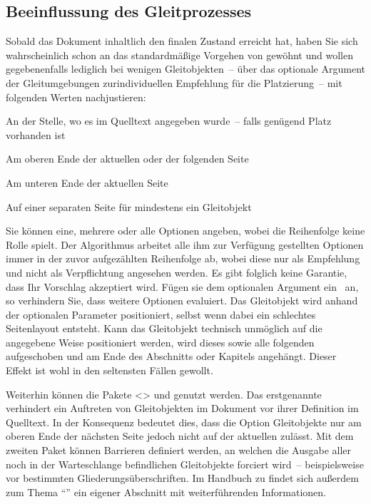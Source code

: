 \documentclass[%
  english,ngerman,%
  cdgeometry=no,DIV=12,%
  cd=false,cdfont=false,cdtitle=true,%
  headings=normal,%
  automark,%
  listof=toc,%
]{tudscrartcl}
\begin{document}
\subsection{Beeinflussung des Gleitprozesses}

Sobald das Dokument inhaltlich den finalen Zustand erreicht hat, haben Sie sich 
wahrscheinlich schon an das standardmäßige Vorgehen von  
gewöhnt und wollen gegebenenfalls lediglich bei wenigen Gleitobjekten~-- über 
das optionale Argument der Gleitumgebungen zurindividuellen Empfehlung für die 
Platzierung~-- mit folgenden Werten nachjustieren:
%
\begin{description}[labelindent=\parindent,leftmargin=*,style=nextline,itemsep=0pt]
\item[\OPValue{h} (here)]
  An der Stelle, wo es im Quelltext angegeben wurde~-- falls genügend Platz 
  vorhanden ist
\item[\OPValue{t} (top)]
  Am oberen Ende der aktuellen oder der folgenden Seite
\item[\OPValue{b} (bottom)]
  Am unteren Ende der aktuellen Seite
\item[\OPValue{p} (page)]
  Auf einer separaten Seite für mindestens ein Gleitobjekt
\end{description}
%
Sie können eine, mehrere oder alle Optionen angeben, wobei die Reihenfolge 
keine Rolle spielt. Der Algorithmus arbeitet alle ihm zur Verfügung gestellten 
Optionen immer in der zuvor aufgezählten Reihenfolge ab, wobei diese nur als 
Empfehlung und nicht als Verpflichtung angesehen werden. Es gibt folglich keine 
Garantie, dass Ihr Vorschlag akzeptiert wird. Fügen sie dem optionalen Argument 
ein~\PValue{!} an, so verhindern Sie, dass  weitere Optionen 
evaluiert. Das Gleitobjekt wird anhand der optionalen Parameter positioniert, 
selbst wenn dabei ein schlechtes Seitenlayout entsteht. Kann das Gleitobjekt 
technisch unmöglich auf die angegebene Weise positioniert werden, wird dieses 
sowie alle folgenden aufgeschoben und am Ende des Abschnitts oder Kapitels 
angehängt. Dieser Effekt ist wohl in den seltensten Fällen gewollt. 

Weiterhin können die Pakete <> und  genutzt 
werden. Das erstgenannte verhindert ein Auftreten von Gleitobjekten im Dokument 
vor ihrer Definition im Quelltext. In der Konsequenz bedeutet dies, dass die 
Option  Gleitobjekte nur am oberen Ende der nächsten Seite 
jedoch nicht auf der aktuellen zulässt. Mit dem zweiten Paket können Barrieren 
definiert werden, an welchen die Ausgabe aller noch in der Warteschlange 
befindlichen Gleitobjekte forciert wird~-- beispielsweise vor bestimmten 
Gliederungsüberschriften. Im Handbuch zu \TUDScript findet sich außerdem zum 
Thema \enquote{} 
ein eigener Abschnitt mit weiterführenden Informationen.
\end{document}
